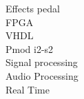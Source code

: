\begin{multicols}{2}
\noindent Effects pedal \\
FPGA \\
VHDL \\
Pmod i2-s2 \\
Signal processing \\
Audio Processing \\
Real Time \\

\end{multicols}